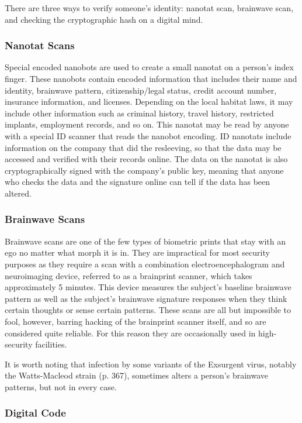 There are three ways to verify someone's identity: 
nanotat scan, brainwave scan, and checking the cryptographic
hash on a digital mind.

\subsubsection{Nanotat Scans}

Special encoded nanobots are used to create a small 
nanotat on a person's index finger. These  nanobots 
contain encoded information that includes their name 
and identity, brainwave pattern, citizenship/legal status, 
credit account number, insurance information, and 
licenses. Depending on the local habitat laws, it may 
include other information such as criminal history, 
travel history, restricted implants, employment records, 
and so on. This nanotat may be read by anyone with 
a special ID scanner that reads the nanobot encoding.
ID nanotats include information on the company 
that did the resleeving, so that the data may be accessed
and verified with their records online. The data
on the nanotat is also cryptographically signed with 
the company's public key, meaning that anyone who 
checks the data and the signature online can tell if the 
data has been altered.

\subsubsection{Brainwave Scans}

Brainwave scans are one of the few types of biometric 
prints that stay with an ego no matter what morph it 
is in. They are impractical for most security purposes 
as they require a scan with a combination electroencephalogram
and neuroimaging device, referred to as
a brainprint scanner, which takes approximately 5 
minutes. This device measures the subject's baseline 
brainwave pattern as well as the subject's brainwave 
signature responses when they think certain thoughts 
or sense certain patterns. These scans are all but 
impossible to fool, however, barring hacking of the 
brainprint scanner itself, and so are considered quite 
reliable. For this reason they are occasionally used in 
high-security facilities.

It is worth noting that infection by some variants 
of the Exsurgent virus, notably the Watts-Macleod 
strain (p. 367), sometimes alters a person's brainwave 
patterns, but not in every case.

\subsubsection{Digital Code}

